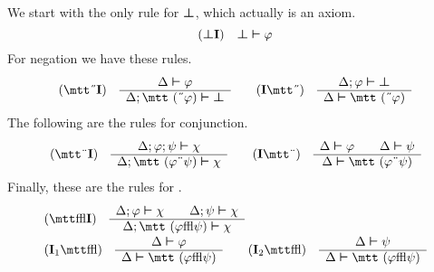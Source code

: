 We start with the only rule for $\boldsymbol{\bot}$, which actually is an axiom.
\begin{equation}
\mbox{\rm ($\boldsymbol{\bot}$\textbf{I})}\quad \boldsymbol{\bot} \boldsymbol{\vdash} \varphi
\end{equation}
For negation we have these rules.
\begin{equation}
\mbox{\rm ({\mtt\symbol{5}}\textbf{I})}\quad
\begin{array}{c}
\Delta \bvdash \varphi \\\hline
\Delta; \mbox{\mtt (\symbol{5}$\varphi$)} \bvdash \sbot
\end{array}
\qquad
\mbox{\rm (\textbf{I}{\mtt\symbol{5}})}\quad
\begin{array}{c}
\Delta; \varphi \bvdash \sbot \\\hline
\Delta \bvdash \mbox{\mtt (\symbol{5}$\varphi$)}
\end{array}
\end{equation}
The following are the rules for conjunction.
\begin{equation}
\mbox{\rm ({\mtt\symbol{4}}\textbf{I})}\quad
\begin{array}{c}
\Delta;\varphi;\psi \bvdash \chi \\\hline
\Delta;\mbox{\mtt ($\varphi$\symbol{4}$\psi$)} \bvdash \chi
\end{array}
\qquad
\mbox{\rm (\textbf{I}{\mtt\symbol{4}})}\quad
\begin{array}{c}
\Delta \bvdash \varphi \qquad \Delta \bvdash \psi\\\hline
\Delta \bvdash \mbox{\mtt ($\varphi$\symbol{4}$\psi$)}
\end{array}
\end{equation}
Finally, these are the rules for {\mtt{}}.
\begin{equation}
\begin{array}{l}
\mbox{\rm ({\mtt\symbol{31}}\textbf{I})}\quad
\begin{array}{c}
\Delta; \varphi \bvdash \chi \qquad \Delta; \psi \bvdash \chi \\\hline
\Delta; \mbox{\mtt ($\varphi$\symbol{31}$\psi$)} \bvdash \chi
\end{array} \\
\mbox{\rm (\textbf{I}$_1${\mtt\symbol{31}})}\quad
\begin{array}{c}
\Delta \bvdash \varphi \\\hline
\Delta \bvdash \mbox{\mtt ($\varphi$\symbol{31}$\psi$)}
\end{array}
\qquad
\mbox{\rm (\textbf{I}$_2${\mtt\symbol{31}})}\quad
\begin{array}{c}
\Delta \bvdash \psi \\\hline
\Delta \bvdash \mbox{\mtt ($\varphi$\symbol{31}$\psi$)}
\end{array}
\end{array}
\end{equation}
